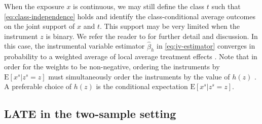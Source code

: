 \documentclass[preprint]{imsart}
\begin{document}
When the exposure $x$ is continuous, we may still define the class $t$
such that \eqref{eq:class-independence} holds and identify the
class-conditional average outcomes on the joint support of $x$ and
$t$. This support may be very limited when the instrument $z$ is
binary. We refer the reader to \citet{imbens2007nonadditive} for
further detail and discussion. In this case, the instrumental variable
estimator $\hat{\beta}_h$ in \eqref{eq:iv-estimator} converges in
probability to a weighted average of local
average treatment effects \citep{angrist2000interpretation}. Note that
in order for the weights to be non-negative, ordering the instruments
by $\mathrm{E}[x^s|z^s=z]$ must simultaneously order the instruments by
the value of $h(z)$ \citep[Theorem 2,3]{angrist2000interpretation}. A
preferable choice of $h(z)$ is the conditional expectation
$\mathrm{E}[x^s|z^s=z]$.

\subsection{LATE in the two-sample setting}
\label{sec:late-two-sample}
\end{document}
